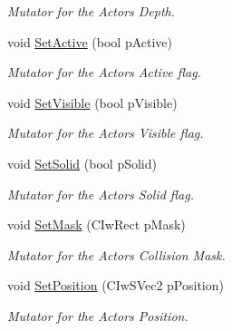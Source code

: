 \begin{DoxyCompactItemize}
\begin{DoxyCompactList}\small\item\em Mutator for the Actors Depth. \end{DoxyCompactList}\item 
void \hyperlink{class_i_ty_actor_ad2a1db314df31d4c1114132154644e2d}{SetActive} (bool pActive)
\begin{DoxyCompactList}\small\item\em Mutator for the Actors Active flag. \end{DoxyCompactList}\item 
void \hyperlink{class_i_ty_actor_af1f3341d3cb568b2420cfce2a570e507}{SetVisible} (bool pVisible)
\begin{DoxyCompactList}\small\item\em Mutator for the Actors Visible flag. \end{DoxyCompactList}\item 
void \hyperlink{class_i_ty_actor_acc5fe8fe823f7a8f95a6bbe505ebe95a}{SetSolid} (bool pSolid)
\begin{DoxyCompactList}\small\item\em Mutator for the Actors Solid flag. \end{DoxyCompactList}\item 
void \hyperlink{class_i_ty_actor_aa119f79b398074a9b9d6281e7b463fee}{SetMask} (CIwRect pMask)
\begin{DoxyCompactList}\small\item\em Mutator for the Actors Collision Mask. \end{DoxyCompactList}\item 
void \hyperlink{class_i_ty_actor_a9b37537093a7b6c412d6f1379b4eabb9}{SetPosition} (CIwSVec2 pPosition)
\begin{DoxyCompactList}\small\item\em Mutator for the Actors Position. \end{DoxyCompactList}\end{DoxyCompactItemize}
